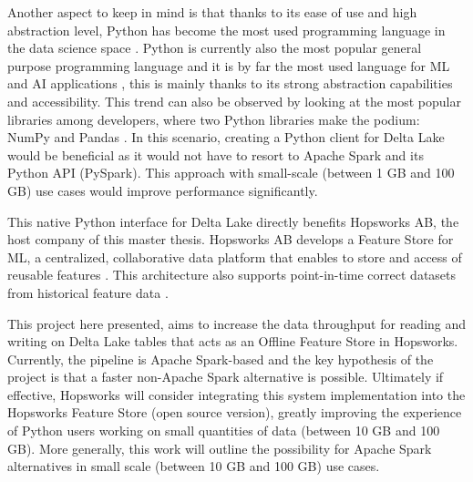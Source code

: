 Another aspect to keep in mind is that thanks to its ease of use and high abstraction level, Python has become the most used programming language in the data science space \cite{nagpalPythonDataAnalytics2019}. Python is currently also the most popular general purpose programming language \cite{TIOBEIndex, StackOverflowDeveloper} and it is by far the most used language for \gls{ML} and \gls{AI} applications \cite{python-machine-learning}, this is mainly thanks to its strong abstraction capabilities and accessibility. This trend can also be observed by looking at the most popular libraries among developers, where two Python libraries make the podium: NumPy and Pandas \cite{StackOverflowDeveloper}.
In this scenario, creating a Python client for Delta Lake would be beneficial as it would not have to resort to Apache Spark and its Python \gls{API} (PySpark). This approach with small-scale (between 1 GB and 100 GB) use cases would improve performance significantly.

This native Python interface for Delta Lake directly benefits Hopsworks AB, the host company of this master thesis. Hopsworks AB develops a Feature Store for \gls{ML}, a centralized, collaborative data platform that enables to store and access of reusable features \cite{HopsworksBatchRealtime2024}. This architecture also supports point-in-time correct datasets from historical feature data \cite{Pettersson1695672}.

This project here presented, aims to increase the data throughput for reading and writing on Delta Lake tables that acts as an Offline Feature Store in Hopsworks. Currently, the pipeline is Apache Spark-based and the key hypothesis of the project is that a faster non-Apache Spark alternative is possible. Ultimately if effective, Hopsworks will consider integrating this system implementation into the Hopsworks Feature Store (open source version), greatly improving the experience of Python users working on small quantities of data (between 10 GB and 100 GB). More generally, this work will outline the possibility for Apache Spark alternatives in small scale (between 10 GB and 100 GB) use cases.